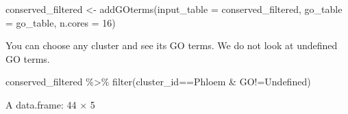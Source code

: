 \documentclass[
  letterpaper,
  DIV=11,
  numbers=noendperiod]{scrartcl}
\newenvironment{Shaded}{\begin{snugshade}}{\end{snugshade}}
\newcommand{\AttributeTok}[1]{\textcolor[rgb]{0.49,0.56,0.16}{#1}}
\newcommand{\DecValTok}[1]{\textcolor[rgb]{0.25,0.63,0.44}{#1}}
\newcommand{\FunctionTok}[1]{\textcolor[rgb]{0.02,0.16,0.49}{#1}}
\newcommand{\NormalTok}[1]{\textcolor[rgb]{0.00,0.44,0.13}{#1}}
\newcommand{\OtherTok}[1]{\textcolor[rgb]{0.00,0.44,0.13}{#1}}
\newcommand{\SpecialCharTok}[1]{\textcolor[rgb]{0.25,0.44,0.63}{#1}}
\newcommand{\StringTok}[1]{\textcolor[rgb]{0.25,0.44,0.63}{#1}}
\begin{document}
\begin{Shaded}
\begin{Highlighting}[]
\NormalTok{conserved\_filtered }\OtherTok{\textless{}{-}} \FunctionTok{addGOterms}\NormalTok{(}\AttributeTok{input\_table =}\NormalTok{ conserved\_filtered,}
                                \AttributeTok{go\_table =}\NormalTok{ go\_table,}
                                \AttributeTok{n.cores =} \DecValTok{16}\NormalTok{)}
\end{Highlighting}
\end{Shaded}

You can choose any cluster and see its GO terms. We do not look at
undefined GO terms.

\begin{Shaded}
\begin{Highlighting}[]
\NormalTok{conserved\_filtered }\SpecialCharTok{\%\textgreater{}\%} \FunctionTok{filter}\NormalTok{(cluster\_id}\SpecialCharTok{==}\StringTok{\textquotesingle{}Phloem\textquotesingle{}} \SpecialCharTok{\&}\NormalTok{ GO}\SpecialCharTok{!=}\StringTok{\textquotesingle{}Undefined\textquotesingle{}}\NormalTok{)}
\end{Highlighting}
\end{Shaded}

A data.frame: 44 × 5
\end{document}
